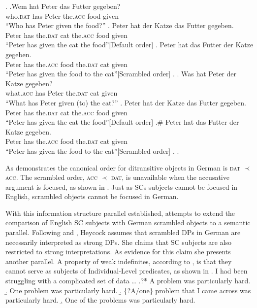 \documentclass[GPFinal]{subfiles}
\begin{document}
\ex.
\ag.Wem hat Peter das Futter gegeben?\\
who.\textsc{dat} has Peter the.\textsc{acc} food given\\
``Who has Peter given the food?''
\ag. Peter hat der Katze das Futter gegeben.\\
Peter has the.\textsc{dat} cat the.\textsc{acc} food given\\
``Peter has given the cat the food''\hfill[Default order]
\bg. Peter hat das Futter der Katze gegeben.\\
Peter has the.\textsc{acc} food the.\textsc{dat} cat given\\
``Peter has given the food to the cat''\hfill[Scrambled order]
\z.
\bg. Was hat Peter der Katze gegeben?\\
what.\textsc{acc} has Peter the.\textsc{dat} cat given\\
``What has Peter given (to) the cat?''
\ag. Peter hat der Katze das Futter gegeben.\\
Peter has the.\textsc{dat} cat the.\textsc{acc} food given\\
``Peter has given the cat the food''\hfill[Default order]
\bg.\# Peter hat das Futter der Katze gegeben.\\
Peter has the.\textsc{acc} food the.\textsc{dat} cat given\\
``Peter has given the food to the cat''\hfill[Scrambled order]
\z.
\z.

As \Last demonstrates the canonical order for ditransitive objects in German is \textsc{dat} $\prec$ \textsc{acc}.
The scrambled order, \textsc{acc} $\prec$ \textsc{dat}, is unavailable when the accusative argument is focused, as shown in \Last[b-ii]. 
Just as SCs subjects cannot be focused in English, scrambled objects cannot be focused in German.

With this information structure parallel established, \textcite{heycock2012specification} attempts to extend the comparison of English SC subjects with German scrambled objects to a semantic parallel.
Following \textcite{dehoop1992case} and \textcite{diesing1992indefinites}, Heycock assumes that scrambled DPs in German are necessarily interpreted as strong DPs.
She claims that SC subjects are also restricted to strong interpretations.
As evidence for this claim she presents another parallel.
A property of weak indefinites, according to \textcite{milsark1974existential}, is that they cannot serve as subjects of Individual-Level predicates, as shown in \Next
\ex. I had been struggling with a complicated set of data \ldots
\a.?* A problem was particularly hard.
\b. One problem was particularly hard.
\b. \{?A/one\} problem that I came across was particularly hard.
\b. One of the problems was particularly hard.\hfill\parencite{heycock2012specification}
\end{document}
